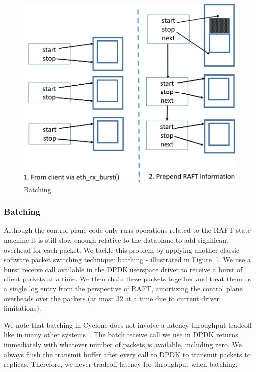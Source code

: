 \documentclass[10pt, preprint, nonatbib]{sigplanconf}
\begin{document}
\begin{figure}
  \centering
  \includegraphics[scale=0.4]{figures2/batching.pdf}
  \caption{Batching}
  \label{fig:batching}
\end{figure}

\subsubsection{Batching}
Although the control plane code only runs operations related to the RAFT state
machine it is still slow enough relative to the dataplane to add significant
overhead for each packet. We tackle this problem by applying another classic
software packet switching technique: batching - illustrated in
Figure~\ref{fig:batching}. We use a burst receive call available in the DPDK
userspace driver to receive a burst of client packets at a time. We then chain
these packets together and treat them as a single log entry from the perspective
of RAFT, amortizing the control plane overheads over the packets (at most 32 at
a time due to current driver limitations).

We note that batching in Cyclone does not involve a latency-throughput
tradeoff like in many other systems~\cite{ix-dataplane}. The batch receive call
we use in DPDK returns immediately with whatever number of packets is available,
including zero. We always flush the transmit buffer after every call to DPDK to
transmit packets to replicas. Therefore, we never tradeoff latency for
throughput when batching. 
\end{document}
